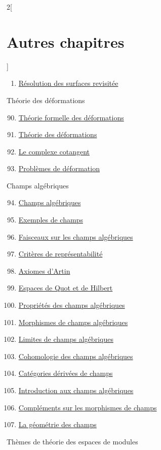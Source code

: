 \begin{multicols}{2}[\section{Autres chapitres}]
\begin{enumerate}
\item \hyperref[spaces-resolve-section-phantom]{Résolution des surfaces revisitée}
\end{enumerate}
Théorie des déformations
\begin{enumerate}
\setcounter{enumi}{89}
\item \hyperref[formal-defos-section-phantom]{Théorie formelle des déformations}
\item \hyperref[defos-section-phantom]{Théorie des déformations}
\item \hyperref[cotangent-section-phantom]{Le complexe cotangent}
\item \hyperref[examples-defos-section-phantom]{Problèmes de déformation}
\end{enumerate}
Champs algébriques
\begin{enumerate}
\setcounter{enumi}{93}
\item \hyperref[algebraic-section-phantom]{Champs algébriques}
\item \hyperref[examples-stacks-section-phantom]{Exemples de champs}
\item \hyperref[stacks-sheaves-section-phantom]{Faisceaux sur les champs algébriques}
\item \hyperref[criteria-section-phantom]{Critères de représentabilité}
\item \hyperref[artin-section-phantom]{Axiomes d'Artin}
\item \hyperref[quot-section-phantom]{Espaces de Quot et de Hilbert}
\item \hyperref[stacks-properties-section-phantom]{Propriétés des champs algébriques}
\item \hyperref[stacks-morphisms-section-phantom]{Morphismes de champs algébriques}
\item \hyperref[stacks-limits-section-phantom]{Limites de champs algébriques}
\item \hyperref[stacks-cohomology-section-phantom]{Cohomologie des champs algébriques}
\item \hyperref[stacks-perfect-section-phantom]{Catégories dérivées de champs}
\item \hyperref[stacks-introduction-section-phantom]{Introduction aux champs algébriques}
\item \hyperref[stacks-more-morphisms-section-phantom]{Compléments sur les morphismes de champs}
\item \hyperref[stacks-geometry-section-phantom]{La géométrie des champs}
\end{enumerate}
Thèmes de théorie des espaces de modules

\end{multicols}
